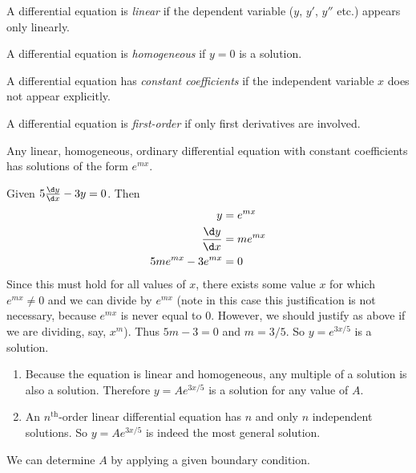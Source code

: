 \documentclass[a4paper]{article}
\begin{document}
  \begin{defi}
    A differential equation is \emph{linear} if the dependent variable ($y$, $y'$, $y''$ etc.) appears only linearly.
  \end{defi}

  \begin{defi}
    A differential equation is \emph{homogeneous} if $y=0$ is a solution.
  \end{defi}

  \begin{defi}
    A differential equation has \emph{constant coefficients} if the independent variable $x$ does not appear explicitly.
  \end{defi}

  \begin{defi}
    A differential equation is \emph{first-order} if only first derivatives are involved.
  \end{defi}

  \begin{thm}
    Any linear, homogeneous, ordinary differential equation with constant coefficients has solutions of the form $e^{mx}$.
  \end{thm}
  \begin{eg}
    Given $5\frac{\d y}{\d x} - 3y = 0$. Then 
    \begin{align*}
      y &= e^{mx}\\
      \frac{\d y}{\d x} &= me^{mx}\\
      5me^{mx} - 3e^{mx} &= 0
    \end{align*}
    Since this must hold for all values of $x$, there exists some value $x$ for which $e^{mx} \not= 0$ and we can divide by $e^{mx}$ (note in this case this justification is not necessary, because $e^{mx}$ is never equal to 0. However, we should justify as above if we are dividing, say, $x^m$). Thus $5m - 3 = 0$ and $m = 3/5$. So $y = e^{3x/5}$ is a solution. 
  \end{eg}

  \begin{enumerate}
    \item Because the equation is linear and homogeneous, any multiple of a solution is also a solution. Therefore $y = Ae^{3x/5}$ is a solution for any value of $A$. 
    \item An $n^\text{th}$-order linear differential equation has $n$ and only $n$ independent solutions. So $y = Ae^{3x/5}$ is indeed the most general solution.
  \end{enumerate}
  We can determine $A$ by applying a given boundary condition.
\end{document}

